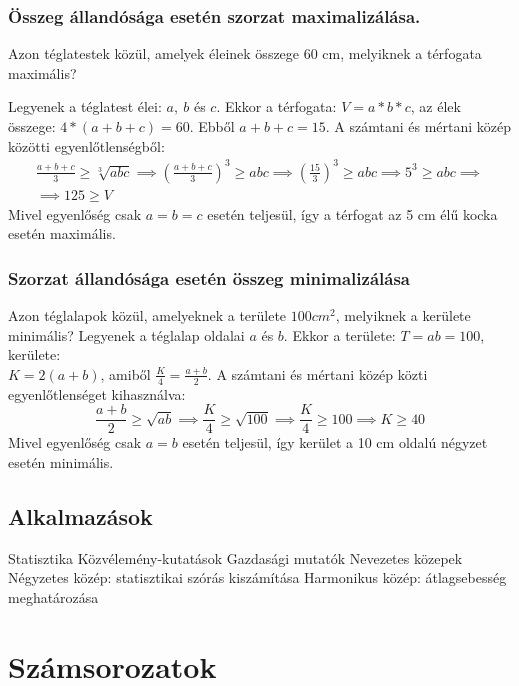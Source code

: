\documentclass[twoside,12pt]{report}
\theoremstyle{definition}
\begin{document}
	\subsection{Összeg állandósága esetén szorzat maximalizálása.}
	Azon téglatestek közül, amelyek éleinek összege 60 cm, melyiknek a térfogata maximális?
	
	Legyenek a téglatest élei: $a,\ b$ és $c$. Ekkor a térfogata: $V=a*b*c$, az élek összege: $4*(a+b+c)=60$. Ebből $a+b+c=15$. A számtani és mértani közép közötti egyenlőtlenségből:
	\begin{gather*}
		\frac{a+b+c}{3}\ge\sqrt[3]{abc}\implies \left(\frac{a+b+c}{3}\right)^3\ge abc\implies \left(\frac{15}{3}\right)^3\ge abc\implies 5^3\ge abc\implies\\
		\implies 125\ge V
	\end{gather*}
	Mivel egyenlőség csak $a=b=c$ esetén teljesül, így a térfogat az 5 cm élű kocka esetén maximális.
	\subsection{Szorzat állandósága esetén összeg minimalizálása}
	Azon téglalapok közül, amelyeknek a területe $100 cm^2$, melyiknek a kerülete minimális?
	Legyenek a téglalap oldalai $a$ és $b$. Ekkor a területe: $T=ab=100$, kerülete: \\
	$K=2(a+b)$, amiből $\frac{K}{4}=\frac{a+b}{2}$. A számtani és mértani közép közti egyenlőtlenséget kihasználva:
	\begin{equation*}
		\frac{a+b}{2}\ge\sqrt{ab}\implies\frac{K}{4}\ge\sqrt{100}\implies\frac{K}{4}\ge 100\implies K\ge 40
	\end{equation*}
	Mivel egyenlőség csak $a=b$ esetén teljesül, így kerület a 10 cm oldalú négyzet esetén minimális.
\section{Alkalmazások}
	\begin{outline}
		\1 Statisztika
			\2 Közvélemény-kutatások
			\2 Gazdasági mutatók
		\1 Nevezetes közepek
			\2 Négyzetes közép: statisztikai szórás kiszámítása
			\2 Harmonikus közép: átlagsebesség meghatározása
	\end{outline}
\chapter{Számsorozatok}
\end{document}
